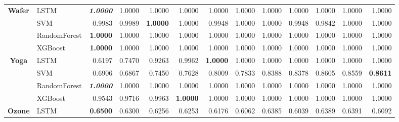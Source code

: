 \begin{table}[H]
\begin{adjustbox}{max width=12cm}
\begin{tabular}{|c|l|r|r|r|r|r|r|r|r|r|r|r|}
			\hline
			\textbf{Wafer}        & LSTM         & \textit{\textbf{1.0000}} & 1.0000          & 1.0000          & 1.0000          & 1.0000                   & 1.0000          & 1.0000 & 1.0000 & 1.0000          & 1.0000                   & 1.0000                   \\
			                      & SVM          & 0.9983                   & 0.9989          & \textbf{1.0000} & 1.0000          & 0.9948                   & 1.0000          & 1.0000 & 0.9948 & 0.9842          & 1.0000                   & 1.0000                   \\
			                      & RandomForest & \textbf{1.0000}          & 1.0000          & 1.0000          & 1.0000          & 1.0000                   & 1.0000          & 1.0000 & 1.0000 & 1.0000          & 1.0000                   & 1.0000                   \\
			                      & XGBoost      & \textbf{1.0000}          & 1.0000          & 1.0000          & 1.0000          & 1.0000                   & 1.0000          & 1.0000 & 1.0000 & 1.0000          & 1.0000                   & 1.0000                   \\
			\hline
			\textbf{Yoga}         & LSTM         & 0.6197                   & 0.7470          & 0.9263          & 0.9962          & \textbf{1.0000}          & 1.0000          & 1.0000 & 1.0000 & 1.0000          & 1.0000                   & 1.0000                   \\
			                      & SVM          & 0.6906                   & 0.6867          & 0.7450          & 0.7628          & 0.8009                   & 0.7833          & 0.8388 & 0.8378 & 0.8605          & 0.8559                   & \textbf{0.8611}          \\
			                      & RandomForest & \textit{\textbf{1.0000}} & 1.0000          & 1.0000          & 1.0000          & 1.0000                   & 1.0000          & 1.0000 & 1.0000 & 1.0000          & 1.0000                   & 1.0000                   \\
			                      & XGBoost      & 0.9543                   & 0.9716          & 0.9963          & \textbf{1.0000} & 1.0000                   & 1.0000          & 1.0000 & 1.0000 & 1.0000          & 1.0000                   & 1.0000                   \\
			\hline
			\textbf{Ozone}        & LSTM         & \textbf{0.6500}          & 0.6300          & 0.6256          & 0.6253          & 0.6176                   & 0.6062          & 0.6385 & 0.6039 & 0.6389          & 0.6391                   & 0.6092                   \\

\end{tabular}
\end{adjustbox}
\end{table}
